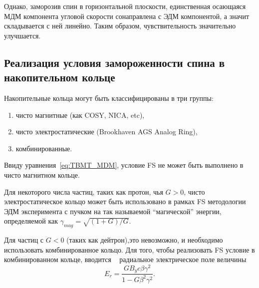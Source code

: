 \documentclass{report}
\begin{document}
Однако, заморозив спин в горизонтальной плоскости, единственная
осающаяся МДМ компонента угловой скорости сонаправлена с ЭДМ
компонентой, а значит складывается с ней линейно. Таким образом,
чувствительность значительно улучшается.

\subsection{Реализация условия замороженности спина в накопительном кольце}\label{sec:FS_in_SR}
Накопительные кольца могут быть классифицированы в три группы:
\begin{enumerate}
\item чисто магнитные (как COSY, NICA, etc),
\item чисто электростатические (Brookhaven AGS Analog Ring),
\item комбинированные.
\end{enumerate}

Ввиду уравнения~\eqref{eq:TBMT_MDM}, условие FS не может быть
выполнено в чисто магнитном кольце.

Для некоторого числа частиц, таких как протон, чья $G>0$, чисто
электростатическое кольцо может быть использовано в рамках FS
методологии ЭДМ эксперимента с пучком на так называемой ``магической''
энергии, определяемой как $\gamma_{mag} = \sqrt{(1+G)/G}$.

Для частиц с $G<0$ (таких как дейтрон),это невозможно, и необходимо
использовать комбинированное кольцо. Для того, чтобы реализовать FS
условие в комбинированном кольце, вводится ~\cite{BNL:Deuteron2008} радиальное электрическое
поле величины
\begin{equation}\label{eq:FS_Er}
  E_r = \frac{GB_yc\beta\gamma^2}{1-G\beta^2\gamma^2}.
\end{equation}
\end{document}
